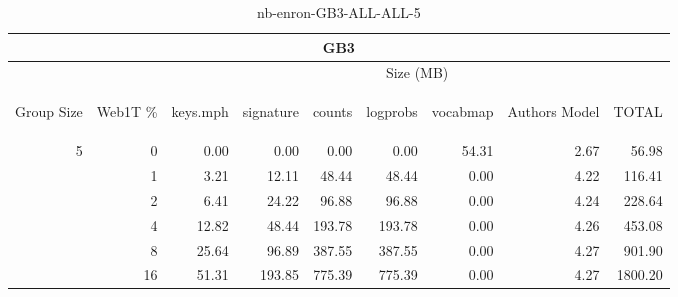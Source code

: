 \begin{center}
\begin{table}[htbp]
\begin{tabular}{ | r | r | r | r | r | r | r | r | r |}
\hline
\multicolumn{9}{|c|}{GB3}\\
\hline
 & & \multicolumn{7}{|c|}{Size (MB)}\\ \cline{3-9}
\begin{sideways}Group Size\end{sideways} & \begin{sideways}Web1T \% \end{sideways} & \begin{sideways}keys.mph\end{sideways} & \begin{sideways}signature\end{sideways} & \begin{sideways}counts\end{sideways} & \begin{sideways}logprobs\end{sideways} & \begin{sideways}vocabmap\end{sideways} & \begin{sideways}Authors Model \end{sideways} & \begin{sideways}TOTAL\end{sideways}\\
\hline
\multirow{5}{*}{5}
 & 0 & 0.00 & 0.00 & 0.00 & 0.00 & 54.31 & 2.67 & 56.98\\ \cline{2-9}
 & 1 & 3.21 & 12.11 & 48.44 & 48.44 & 0.00 & 4.22 & 116.41\\ \cline{2-9}
 & 2 & 6.41 & 24.22 & 96.88 & 96.88 & 0.00 & 4.24 & 228.64\\ \cline{2-9}
 & 4 & 12.82 & 48.44 & 193.78 & 193.78 & 0.00 & 4.26 & 453.08\\ \cline{2-9}
 & 8 & 25.64 & 96.89 & 387.55 & 387.55 & 0.00 & 4.27 & 901.90\\ \cline{2-9}
 & 16 & 51.31 & 193.85 & 775.39 & 775.39 & 0.00 & 4.27 & 1800.20\\ \cline{2-9}
\hline
\end{tabular}
\caption{nb-enron-GB3-ALL-ALL-5}
\label{table:nb-enron-GB3-ALL-ALL-5}
\end{table}
\end{center}


